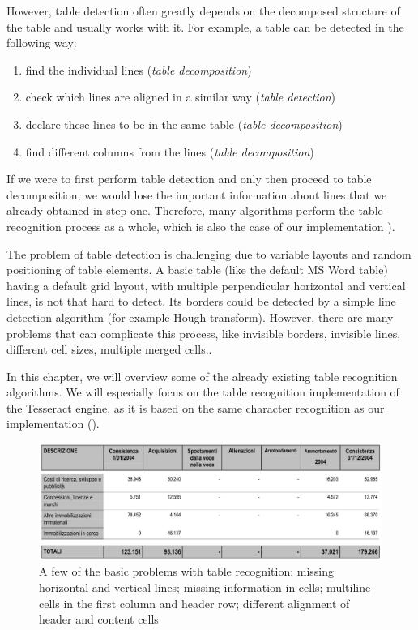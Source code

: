 However, table detection often greatly depends on the decomposed structure of the table and usually works with it. For example, a table can be detected in the following way:

\begin{enumerate}
    \item find the individual lines (\emph{table decomposition})
    \item check which lines are aligned in a similar way (\emph{table detection})
    \item declare these lines to be in the same table (\emph{table decomposition})
    \item find different columns from the lines (\emph{table decomposition})
\end{enumerate}

If we were to first perform table detection and only then proceed to table decomposition, we would lose the important information about lines that we already obtained in step one. Therefore, many algorithms perform the table recognition process as a whole, which is also the case of our implementation ).

The problem of table detection is challenging due to variable layouts and random positioning of table elements. A basic table (like the default MS Word table) having a default grid layout, with multiple perpendicular horizontal and vertical lines, is not that hard to detect. Its borders could be detected by a simple line detection algorithm (for example Hough transform). However, there are many problems that can complicate this process, like invisible borders, invisible lines, different cell sizes, multiple merged cells..

In this chapter, we will overview some of the already existing table recognition algorithms. We will especially focus on the table recognition implementation of the Tesseract engine, as it is based on the same character recognition as our implementation (). 

\begin{figure}[H]
\centering
\includegraphics[width=0.7\linewidth]{img/tableDetection/recognitionProblematic.jpg}
\caption{A few of the basic problems with table recognition: missing horizontal and vertical lines; missing information in cells; multiline cells in the first column and header row; different alignment of header and content cells } \label{fig:1a}
\end{figure}

